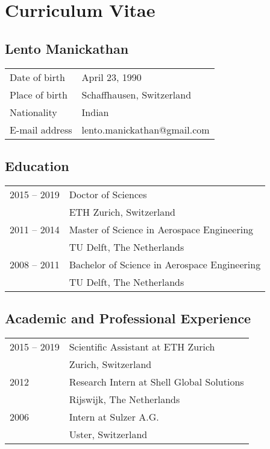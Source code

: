 
\chapter{Curriculum Vitae}

\thispagestyle{empty}

\section*{Lento Manickathan}

\begin{tabular}{ll}
Date of birth	&  April 23, 1990\\ 
Place of birth	&  Schaffhausen, Switzerland\\ 
Nationality	& Indian \\ 
E-mail address	& lento.manickathan@gmail.com \\ 
\end{tabular} 

\vfill

\section*{Education}
\begin{tabular}{l p{10cm}}
2015 -- 2019  & Doctor of Sciences \\ 
~	&  ETH Zurich, Switzerland \\
2011 -- 2014  &  Master of Science in Aerospace Engineering\\ 
~	&  TU Delft, The Netherlands\\
2008 -- 2011  &  Bachelor of Science in Aerospace Engineering\\
~	&  TU Delft, The Netherlands \\
\end{tabular} 

\section*{Academic and Professional Experience}
\begin{tabular}{l p{10cm}}
	2015 -- 2019  & Scientific Assistant at ETH Zurich \\ 
	~	&  Zurich, Switzerland \\
	2012 &  Research Intern at Shell Global Solutions \\ 
	~	&  Rijswijk, The Netherlands\\
	2006 & Intern at Sulzer A.G. \\
	~ 	& Uster, Switzerland
\end{tabular} 

